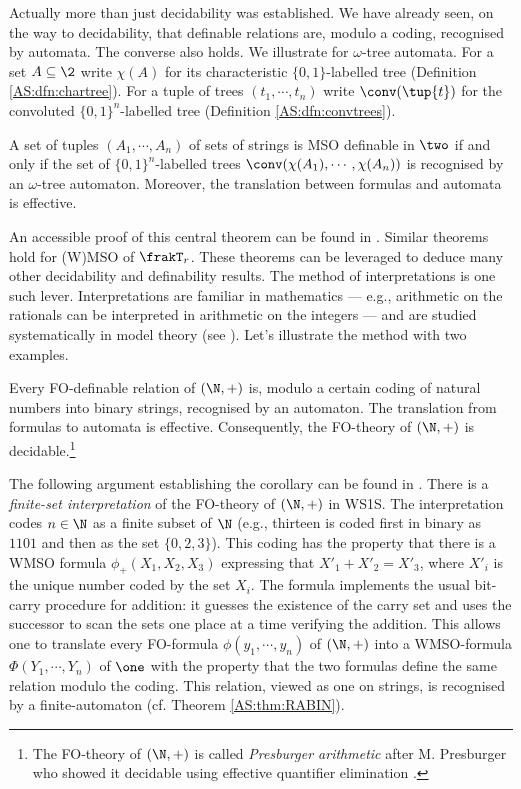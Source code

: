 Actually more than just decidability was established. We have already seen, on the way to decidability, that definable relations are, modulo a coding, recognised by automata. The converse also holds. We illustrate for $\omega$-tree automata. For a set $A \subseteq \2$ write $\chi(A)$ for its characteristic $\{0,1\}$-labelled tree (Definition \ref{AS:dfn:chartree}). For a tuple of trees $(t_1,\cdots,t_n)$ write $\conv(\tup{t})$
for the convoluted $\{0,1\}^n$-labelled tree (Definition \ref{AS:dfn:convtrees}).  

\begin{theorem} \label{AS:thm:RABIN}
A set of tuples $(A_1,\cdots,A_n)$ of sets of strings is MSO definable in $\two$ if and only if the set of $\{0,1\}^n$-labelled trees 
$\conv(\chi(A_1),\cdots,\chi(A_n))$ is recognised by an $\omega$-tree automaton. Moreover, the translation between formulas and automata is effective.
\end{theorem}

An accessible proof of this central theorem can be found in \cite{Thom90}. Similar theorems hold for (W)MSO of $\frakT_r$.
These theorems can be leveraged to deduce many other decidability and definability results. The method of interpretations is one such lever.
Interpretations are familiar in mathematics --- e.g., arithmetic on the rationals can be interpreted in arithmetic on the integers ---
and are studied systematically in model theory (see \cite{Hodg93}). Let's illustrate the method with two examples.




\begin{corollary} \label{AS:cor:pres}
 Every FO-definable relation of $(\N,+)$ is, modulo a certain coding of natural numbers into binary strings, recognised by an automaton. 
The translation from formulas to automata is effective. Consequently, the FO-theory of $(\N,+)$ is decidable.\footnote{The FO-theory of $(\N,+)$ is called {\em Presburger arithmetic} after M. Presburger who showed it decidable using effective quantifier elimination \cite{Pres29}.}

\end{corollary}

The following argument establishing the corollary can be found in \cite{Robi58} \cite{Buch60} \cite{Elgo61}. There is a {\em finite-set interpretation} of the FO-theory of $(\N,+)$ in WS1S.
The interpretation codes $n \in \N$ as a finite subset of $\N$ (e.g., thirteen is coded first in binary as $1101$ and then as the set $\{0,2,3\}$). This coding has the property that there is a WMSO formula $\phi_+(X_1,X_2,X_3)$ expressing that 
$X'_1 + X'_2 = X'_3$, where $X'_i$ is the unique number coded by the set $X_i$. The formula implements the usual bit-carry procedure for addition:
it guesses the existence of the carry set and uses the successor to scan the
sets one place at a time verifying the addition. 
This allows one to translate every FO-formula $\phi(y_1,\cdots,y_n)$ of $(\N,+)$ into a WMSO-formula
$\Phi(Y_1,\cdots,Y_n)$ of $\one$  with the property that
the two formulas define the same relation modulo the coding. This relation, viewed as one on strings,
is recognised by a finite-automaton (cf. Theorem \ref{AS:thm:RABIN}).

